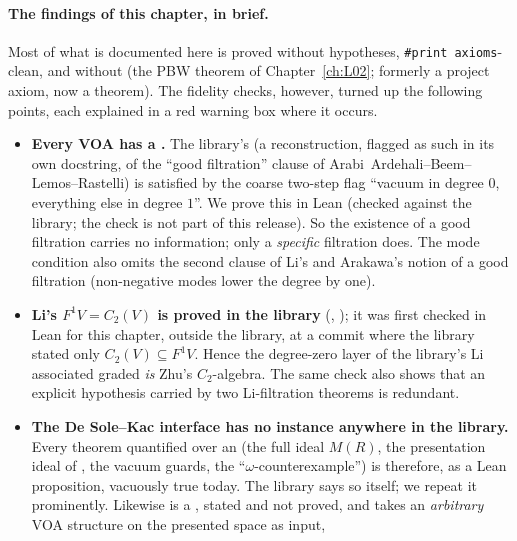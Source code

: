 \paragraph{The findings of this chapter, in brief.} Most of what is documented here is proved
without hypotheses, \texttt{\#print axioms}-clean, and without  (the PBW theorem of Chapter~\ref{ch:L02}; formerly a project axiom, now a theorem). The fidelity checks, however, turned up the following points, each explained in a
red warning box where it occurs.
\begin{itemize}
\item \textbf{Every VOA has a .} The library's  (a
  reconstruction, flagged as such in its own docstring, of the ``good filtration'' clause of
  Arabi~Ardehali--Beem--Lemos--Rastelli) is satisfied by the coarse two-step flag
  ``vacuum in degree $0$, everything else in degree $1$''. We prove this in Lean (checked against the library; the check is not part of this
  release). So the existence of a good filtration carries no information; only
  a \emph{specific} filtration does. The mode condition also omits the second clause of Li's and
  Arakawa's notion of a good filtration (non-negative modes lower the degree by one).
\item \textbf{Li's $F^1V = C_2(V)$ is proved in the library} (\allowbreak{}\allowbreak{}\allowbreak{}\allowbreak{},
  ); it was first checked in Lean for this chapter, outside the library, at a
  commit where the library stated only $C_2(V)\subseteq F^1V$. Hence
  the degree-zero layer of the library's Li associated graded \emph{is} Zhu's $C_2$-algebra. The
  same check also shows that an explicit  hypothesis carried by two Li-filtration
  theorems is redundant.
\item \textbf{The De Sole--Kac interface  has no instance anywhere in the
  library.} Every theorem quantified over an  (the full ideal $M(R)$, the
  presentation ideal of , the vacuum guards, the ``$\omega$-counterexample'')
  is therefore, as a Lean proposition, vacuously true today. The library says so itself; we repeat
  it prominently. Likewise \allowbreak{}\allowbreak{} is a , stated and not
  proved, and  takes an \emph{arbitrary} VOA structure on the presented space as input,

\end{itemize}
